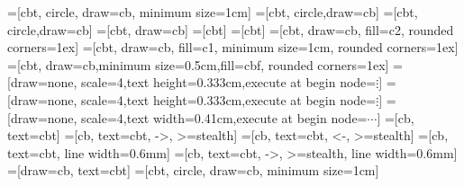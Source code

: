 \usepackage{amsmath}
\usepackage{amssymb}
\usepackage{mathtools}
\usepackage{bm}
\usepackage{tikz}
\usetikzlibrary{positioning}
\usetikzlibrary{calc}

\newcommand{\matr}[1]{\bm{#1}}
\newcommand{\vect}[1]{\bm{#1}}
\def\RSet{\mathbb{R}}


=[cbt, circle, draw=cb, minimum size=1cm]
=[cbt, circle,draw=cb]
=[cbt, circle,draw=cb]
=[cbt, draw=cb]
=[cbt]
=[cbt]
=[cbt, draw=cb, fill=c2, rounded corners=1ex]
=[cbt, draw=cb, fill=c1, minimum size=1cm, rounded corners=1ex]
=[cbt, draw=cb,minimum size=0.5cm,fill=cbf, rounded corners=1ex]
=[draw=none, scale=4,text height=0.333cm,execute at begin node=\color{black}$\vdots$]
=[draw=none, scale=4,text height=0.333cm,execute at begin node=\color{black}$\vdots$]
=[draw=none, scale=4,text width=0.41cm,execute at
begin node=\color{black}$\cdots$]
=[cb, text=cbt]
=[cb, text=cbt, ->, >=stealth]
=[cb, text=cbt, <-, >=stealth]
=[cb, text=cbt, line width=0.6mm]
=[cb, text=cbt, ->, >=stealth, line width=0.6mm]
=[draw=cb, text=cbt]
=[cbt, circle, draw=cb, minimum size=1cm]

